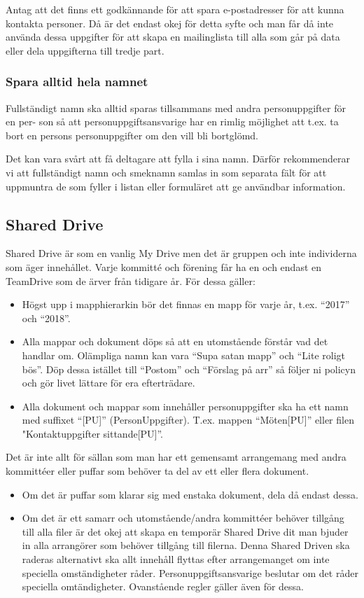 Antag att det finns ett godkännande för att spara e-postadresser för att kunna kontakta
personer. Då är det endast okej för detta syfte och man får då inte använda dessa uppgifter för att skapa en mailinglista till alla som går på data eller dela uppgifterna till tredje part.

\subsubsection{Spara alltid hela namnet}
Fullständigt namn ska alltid sparas tillsammans med andra personuppgifter för en per-
son så att personuppgiftsansvarige har en rimlig möjlighet att t.ex. ta bort en persons
personuppgifter om den vill bli bortglömd.

Det kan vara svårt att få deltagare att fylla i sina namn. Därför rekommenderar vi att
fullständigt namn och smeknamn samlas in som separata fält för att uppmuntra de som
fyller i listan eller formuläret att ge användbar information.

\subsection{Shared Drive}
Shared Drive är som en vanlig My Drive men det är gruppen och inte individerna som äger
innehållet. Varje kommitté och förening får ha en och endast en TeamDrive som de ärver
från tidigare år. För dessa gäller:
\begin{itemize}
    \item Högst upp i mapphierarkin bör det finnas en mapp för varje år, t.ex. “2017” och “2018”.
    \item Alla mappar och dokument döps så att en utomstående förstår vad det handlar om. Olämpliga namn kan vara “Supa satan mapp” och “Lite roligt bös”. Döp dessa istället till “Postom” och “Förslag på arr” så följer ni policyn och gör livet lättare för era efterträdare.
    \item Alla dokument och mappar som innehåller personuppgifter ska ha ett namn med
suffixet “[PU]” (PersonUppgifter). T.ex. mappen “Möten[PU]” eller filen "Kontaktuppgifter sittande[PU]”.
\end{itemize}

Det är inte allt för sällan som man har ett gemensamt arrangemang med andra kommittéer
eller puffar som behöver ta del av ett eller flera dokument.

\begin{itemize}
    \item Om det är puffar som klarar sig med enstaka dokument, dela då endast dessa.
    \item Om det är ett samarr och utomstående/andra kommittéer behöver tillgång till alla filer är det okej att skapa en temporär Shared Drive dit man bjuder in alla arrangörer som behöver tillgång till filerna. Denna Shared Driven ska raderas alternativt ska allt innehåll flyttas efter arrangemanget om inte speciella omständigheter råder. Personuppgiftsansvarige beslutar om det råder speciella omtändigheter. Ovanstående regler gäller även för dessa.
\end{itemize}

